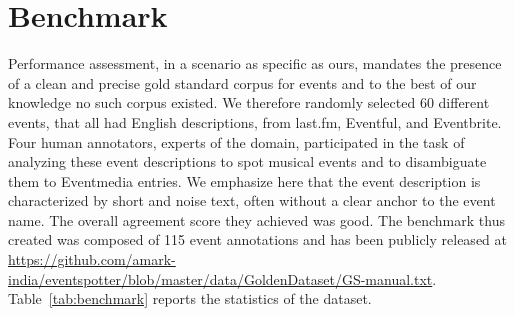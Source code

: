\documentclass[10pt,a4paper]{article}
\begin{document}
%
%
%
%
%
%	
%
%	 


\section{Benchmark}
Performance assessment, in a scenario as specific as ours, mandates the presence of a clean and precise gold standard corpus for events and to the best of our knowledge no such corpus existed. We therefore randomly selected 60 different events, that all had English descriptions, from last.fm, Eventful, and Eventbrite. Four human annotators, experts of the domain, participated in the task of analyzing these event descriptions to spot musical events and to disambiguate them to Eventmedia entries. We emphasize here that the event description is characterized by short and noise text, often without a clear anchor to the event name.  The overall agreement score they achieved was good. The benchmark thus created was composed of 115 event annotations and has been publicly released at \url{https://github.com/amark-india/eventspotter/blob/master/data/GoldenDataset/GS-manual.txt}. Table~\ref{tab:benchmark} reports the statistics of the dataset.
\end{document}
